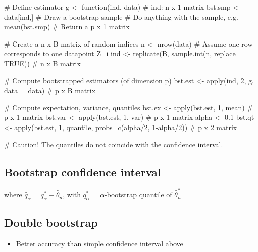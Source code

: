 \begin{code}
 # Define estimator
 g <- function(ind, data){ # ind: n x 1 matrix
    bst.smp <- data[ind,] # Draw a bootstrap sample
    # Do anything with the sample, e.g. mean(bst.smp)
    # Return a p x 1 matrix
 }
 
 # Create a n x B matrix of random indices
 n <- nrow(data) # Assume one row corresponds to one datapoint Z_i
 ind <- replicate(B, sample.int(n, replace = TRUE)) # n x B matrix
 
 # Compute bootstrapped estimators (of dimension p)
 bst.est <- apply(ind, 2, g, data = data) # p x B matrix
 
 # Compute expectation, variance, quantiles
 bst.ex  <- apply(bst.est, 1, mean) # p x 1 matrix
 bst.var <- apply(bst.est, 1, var)  # p x 1 matrix
 alpha <- 0.1
 bst.qt  <- apply(bst.est, 1, quantile, probs=c(alpha/2, 1-alpha/2)) # p x 2 matrix

 # Caution! The quantiles do not coincide with the confidence interval.
 \end{code}
 \subsection{Bootstrap confidence interval}
 \begin{theory}
  \begin{equation*}
   [2\hat{\theta}_n - q^{\ast}_{1-\alpha/2}, 2\hat{\theta}_n - q^{\ast}_{\alpha/2}]
  \end{equation*}
  where $\hat{q}_{\alpha} = q_{\alpha}^{\ast} - \hat{\theta}_n$, with $q^{\ast}_{\alpha}$ = $\alpha$-bootstrap quantile of $\hat{\theta}^{\ast}_n$  
 \end{theory}

 \subsection{Double bootstrap}
 \begin{application}
  \begin{itemize}
   \item[\leftthumbsup] Better accuracy than simple confidence interval above
  \end{itemize}

 \end{application}


